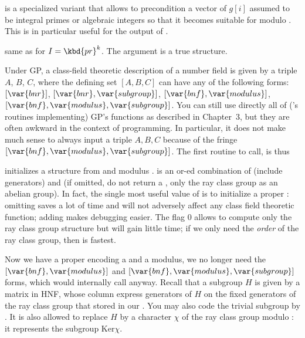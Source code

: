  is a
specialized variant that allows to precondition a vector of $g[i]$ assumed to
be integral primes or algebraic integers so that it becomes suitable for
 modulo . This is in particular
useful for the output of .

 same as
 for $I = \kbd{pr}^k$. The  argument is a true 
structure.


Under GP, a class-field theoretic description of a number field is given by a
triple $A$, $B$, $C$, where the defining set $[A,B,C]$ can have any of the
following forms: $[\var{bnr}]$, $[\var{bnr},\var{subgroup}]$,
$[\var{bnf},\var{modulus}]$, $[\var{bnf},\var{modulus},\var{subgroup}]$.
You can still use directly all of ('s routines implementing) GP's
functions as described in Chapter~3, but they are often awkward in the context
of  programming. In particular, it does not make much sense to
always input a triple $A,B,C$ because of the fringe
$[\var{bnf},\var{modulus},\var{subgroup}]$. The first routine to call, is
thus

 initializes a 
structure from  and modulus .  is an or-ed
combination of  (include generators) and  (if
omitted, do not return a , only the ray class group as an abelian
group). In fact, the single most useful value of  is
 to initialize a proper : omitting
 saves a lot of time and will not adversely affect
any class field theoretic function; adding  makes debugging
easier. The flag 0 allows to compute only the ray class group structure but
will gain little time; if we only need the \emph{order} of the ray class
group, then  is fastest.

Now we have a proper  encoding a  and a modulus, we no longer
need the $[\var{bnf},\var{modulus}]$ and
$[\var{bnf},\var{modulus},\var{subgroup}]$ forms, which would internally call
 anyway. Recall that a subgroup $H$ is given by a matrix in HNF,
whose column express generators of $H$ on the fixed generators of the ray class
group that stored in our . You may also code the trivial subgroup by
. It is also allowed to replace $H$ by a character $\chi$ of the ray
class group modulo : it represents the subgroup $\text{Ker} \chi$.

